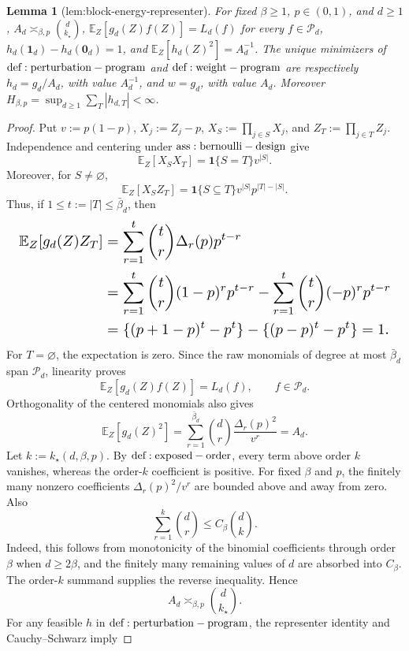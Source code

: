 \documentclass{article}
\newtheorem{lemma}{Lemma}
\begin{document}
\begin{lemma}[lem:block-energy-representer]\label{lem:block-energy-representer}
For fixed \(\beta\ge1\), \(p\in(0,1)\), and \(d\ge1\), \(A_d\asymp_{\beta,p}\binom{d}{k_\star}\), \(\mathbb E_Z[g_d(Z)f(Z)]=L_d(f)\) for every \(f\in\mathcal P_d\), \(h_d(\mathbf1_d)-h_d(\mathbf0_d)=1\), and \(\mathbb E_Z[h_d(Z)^2]=A_d^{-1}\). The unique minimizers of \({\rm def:perturbation-program}\) and \({\rm def:weight-program}\) are respectively \(h_d=g_d/A_d\), with value \(A_d^{-1}\), and \(w=g_d\), with value \(A_d\). Moreover \(H_{\beta,p}=\sup_{d\ge1}\sum_T|h_{d,T}|<\infty\).
\end{lemma}
\begin{proof}
Put \(v:=p(1-p)\), \(X_j:=Z_j-p\), \(X_S:=\prod_{j\in S}X_j\), and \(Z_T:=\prod_{j\in T}Z_j\). Independence and centering under \({\rm ass:bernoulli-design}\) give
\[
\mathbb E_Z[X_SX_T]=\mathbf 1\{S=T\}v^{|S|}.
\]
Moreover, for \(S\ne\varnothing\),
\[
\mathbb E_Z[X_SZ_T]=\mathbf 1\{S\subseteq T\}v^{|S|}p^{|T|-|S|}.
\]
Thus, if \(1\le t:=|T|\le\bar\beta_d\), then
\[
\makebox[\linewidth][c]{\resizebox{0.98\linewidth}{!}{\(\displaystyle \begin{aligned}
\mathbb E_Z[g_d(Z)Z_T]
&=\sum_{r=1}^{t}\binom tr\Delta_r(p)p^{t-r}\\
&=\sum_{r=1}^{t}\binom tr(1-p)^rp^{t-r}-\sum_{r=1}^{t}\binom tr(-p)^rp^{t-r}\\
&=\{(p+1-p)^t-p^t\}-\{(p-p)^t-p^t\}=1.
\end{aligned}\)}}
\]
For \(T=\varnothing\), the expectation is zero. Since the raw monomials of degree at most \(\bar\beta_d\) span \(\mathcal P_d\), linearity proves
\[
\mathbb E_Z[g_d(Z)f(Z)]=L_d(f),\qquad f\in\mathcal P_d.
\]
Orthogonality of the centered monomials also gives
\[
\mathbb E_Z[g_d(Z)^2]=\sum_{r=1}^{\bar\beta_d}\binom dr\frac{\Delta_r(p)^2}{v^r}=A_d.
\]
Let \(k:=k_\star(d,\beta,p)\). By \({\rm def:exposed-order}\), every term above order \(k\) vanishes, whereas the order-\(k\) coefficient is positive. For fixed \(\beta\) and \(p\), the finitely many nonzero coefficients \(\Delta_r(p)^2/v^r\) are bounded above and away from zero. Also
\[
\sum_{r=1}^{k}\binom dr\le C_\beta\binom dk.
\]
Indeed, this follows from monotonicity of the binomial coefficients through order \(\beta\) when \(d\ge2\beta\), and the finitely many remaining values of \(d\) are absorbed into \(C_\beta\). The order-\(k\) summand supplies the reverse inequality. Hence
\[
A_d\asymp_{\beta,p}\binom d{k_\star}.
\]
For any feasible \(h\) in \({\rm def:perturbation-program}\), the representer identity and Cauchy--Schwarz imply

\end{proof}
\end{document}

